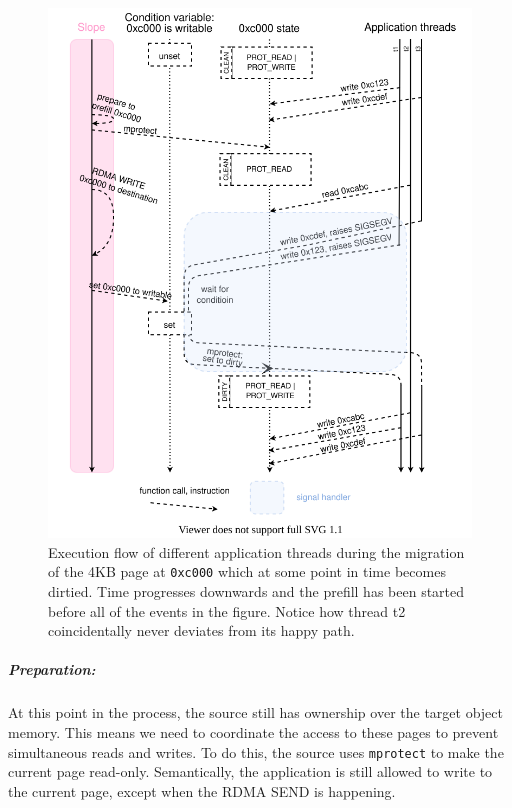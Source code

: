 \begin{figure}[tp]
\centering

\includegraphics[width=1\textwidth]{dirty-detection.drawio}
\caption{
    Execution flow of different application threads during the migration of
    the 4KB page at \texttt{0xc000} which at some point in time becomes dirtied.
    Time progresses downwards and the prefill has been started before all of
    the events in the figure. Notice how thread t2 coincidentally never
    deviates from its happy path.
}
\label{fig:dirtydetection}
\end{figure}

\subparagraph{Preparation:} At this point in the process, the source still
has ownership over the target object memory. This means we need to coordinate
the access to these pages to prevent simultaneous reads and writes. To do this,
the source uses \texttt{mprotect} to make the current page read-only.
Semantically, the application is still allowed to write to the current page,
except when the RDMA SEND is happening.


